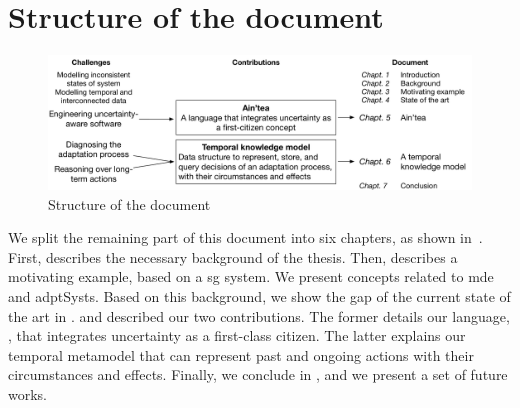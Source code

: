 \section{Structure of the document}

\begin{figure}
	\includegraphics[width=\linewidth]{img/chapt-intro/struct/struct}
	\caption{Structure of the document}
	\label{fig:intro:structDoc}
\end{figure}

We split the remaining part of this document into six chapters, as shown in~.
First,  describes the necessary background of the thesis.
Then,  describes a motivating example, based on a \gls{sg} system.
We present concepts related to \gls{mde} and \glspl{adptSyst}.
Based on this background, we show the gap of the current state of the art in .
 and  described our two contributions.
The former details our language, \langName, that integrates uncertainty as a first-class citizen.
The latter explains our temporal \gls{metamodel} that can represent past and ongoing \glspl{action} with their circumstances and effects.
Finally, we conclude in , and we present a set of future works.